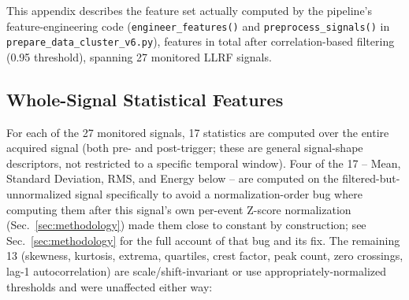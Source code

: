 
\label{appendix:features}

This appendix describes the feature set actually computed by the pipeline's feature-engineering code (\texttt{engineer\_features()} and \texttt{preprocess\_signals()} in \texttt{prepare\_data\_cluster\_v6.py}), \MetricZeroSixBinaryClassificationNFeatures{} features in total after correlation-based filtering (0.95 threshold), spanning 27 monitored LLRF signals.  %

\subsection{Whole-Signal Statistical Features}

For each of the 27 monitored signals, 17 statistics are computed over the entire acquired signal (both pre- and post-trigger; these are general signal-shape descriptors, not restricted to a specific temporal window). Four of the 17 -- Mean, Standard Deviation, RMS, and Energy below -- are computed on the filtered-but-unnormalized signal specifically to avoid a normalization-order bug where computing them after this signal's own per-event Z-score normalization (Sec.~\ref{sec:methodology}) made them close to constant by construction; see Sec.~\ref{sec:methodology} for the full account of that bug and its fix. The remaining 13 (skewness, kurtosis, extrema, quartiles, crest factor, peak count, zero crossings, lag-1 autocorrelation) are scale/shift-invariant or use appropriately-normalized thresholds and were unaffected either way:  %

